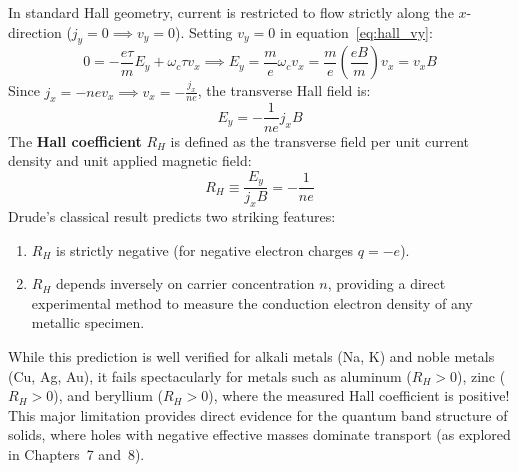 \documentclass[11pt,a4paper]{article}
\begin{document}
In standard Hall geometry, current is restricted to flow strictly along the $x$-direction ($j_y = 0 \implies v_y = 0$). Setting $v_y = 0$ in equation~\eqref{eq:hall_vy}:
\begin{equation}
0 = -\frac{e\tau}{m}E_y + \omega_c\tau v_x \implies E_y = \frac{m}{e}\omega_c v_x = \frac{m}{e}\left(\frac{eB}{m}\right)v_x = v_x B
\label{eq:hall_field}
\end{equation}
Since $j_x = -n e v_x \implies v_x = -\frac{j_x}{ne}$, the transverse Hall field is:
\begin{equation}
E_y = -\frac{1}{ne} j_x B
\end{equation}
The \textbf{Hall coefficient} $R_H$ is defined as the transverse field per unit current density and unit applied magnetic field:
\begin{equation}
\boxed{R_H \equiv \frac{E_y}{j_x B} = -\frac{1}{n e}}
\label{eq:hall_coefficient}
\end{equation}
Drude's classical result predicts two striking features:
\begin{enumerate}
    \item $R_H$ is strictly negative (for negative electron charges $q = -e$).
    \item $R_H$ depends inversely on carrier concentration $n$, providing a direct experimental method to measure the conduction electron density of any metallic specimen.
\end{enumerate}
While this prediction is well verified for alkali metals (Na, K) and noble metals (Cu, Ag, Au), it fails spectacularly for metals such as aluminum ($R_H > 0$), zinc ($R_H > 0$), and beryllium ($R_H > 0$), where the measured Hall coefficient is positive! This major limitation provides direct evidence for the quantum band structure of solids, where holes with negative effective masses dominate transport (as explored in Chapters~7 and~8).

\vspace{0.4cm}
\end{document}
